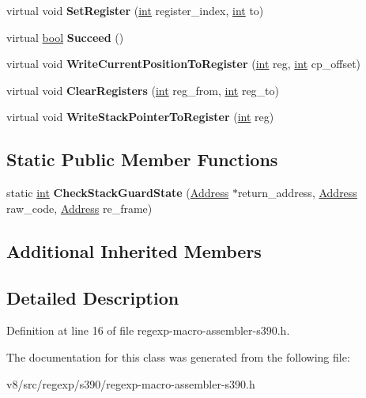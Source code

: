 \begin{DoxyCompactItemize}
virtual void {\bfseries Set\+Register} (\mbox{\hyperlink{classint}{int}} register\+\_\+index, \mbox{\hyperlink{classint}{int}} to)
\item 
\mbox{\label{classv8_1_1internal_1_1RegExpMacroAssemblerS390_a8c60d4f9bd4208ac2eae3535d61250aa}} 
virtual \mbox{\hyperlink{classbool}{bool}} {\bfseries Succeed} ()
\item 
\mbox{\label{classv8_1_1internal_1_1RegExpMacroAssemblerS390_a6911f5eb11b94b108e2570c24373aaaa}} 
virtual void {\bfseries Write\+Current\+Position\+To\+Register} (\mbox{\hyperlink{classint}{int}} reg, \mbox{\hyperlink{classint}{int}} cp\+\_\+offset)
\item 
\mbox{\label{classv8_1_1internal_1_1RegExpMacroAssemblerS390_ac43da7fad740c0f320554cec647df577}} 
virtual void {\bfseries Clear\+Registers} (\mbox{\hyperlink{classint}{int}} reg\+\_\+from, \mbox{\hyperlink{classint}{int}} reg\+\_\+to)
\item 
\mbox{\label{classv8_1_1internal_1_1RegExpMacroAssemblerS390_a7345e116635887f9e514cf38cb128a37}} 
virtual void {\bfseries Write\+Stack\+Pointer\+To\+Register} (\mbox{\hyperlink{classint}{int}} reg)
\end{DoxyCompactItemize}
\subsection*{Static Public Member Functions}
\begin{DoxyCompactItemize}
\item 
\mbox{\label{classv8_1_1internal_1_1RegExpMacroAssemblerS390_af5b18cc21c7d0982d13dd98802af3d9b}} 
static \mbox{\hyperlink{classint}{int}} {\bfseries Check\+Stack\+Guard\+State} (\mbox{\hyperlink{classuintptr__t}{Address}} $\ast$return\+\_\+address, \mbox{\hyperlink{classuintptr__t}{Address}} raw\+\_\+code, \mbox{\hyperlink{classuintptr__t}{Address}} re\+\_\+frame)
\end{DoxyCompactItemize}
\subsection*{Additional Inherited Members}


\subsection{Detailed Description}


Definition at line 16 of file regexp-\/macro-\/assembler-\/s390.\+h.



The documentation for this class was generated from the following file\+:\begin{DoxyCompactItemize}
\item 
v8/src/regexp/s390/regexp-\/macro-\/assembler-\/s390.\+h\end{DoxyCompactItemize}

